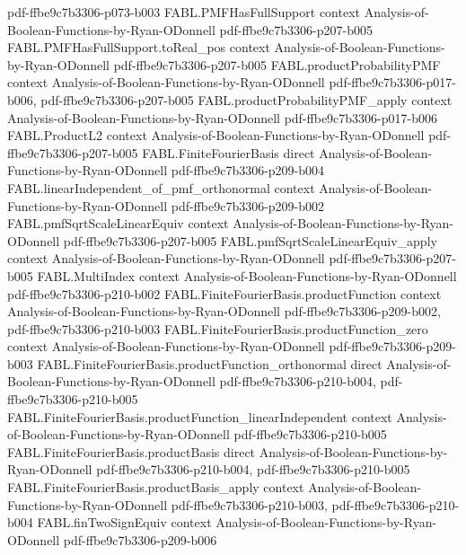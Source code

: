 \begin{theorem}
  {pdf-ffbe9c7b3306-p073-b003}
\proofstep
  {FABL.PMFHasFullSupport}
  {context}
  {Analysis-of-Boolean-Functions-by-Ryan-ODonnell}
  {pdf-ffbe9c7b3306-p207-b005}
\proofstep
  {FABL.PMFHasFullSupport.toReal_pos}
  {context}
  {Analysis-of-Boolean-Functions-by-Ryan-ODonnell}
  {pdf-ffbe9c7b3306-p207-b005}
\proofstep
  {FABL.productProbabilityPMF}
  {context}
  {Analysis-of-Boolean-Functions-by-Ryan-ODonnell}
  {pdf-ffbe9c7b3306-p017-b006,
    pdf-ffbe9c7b3306-p207-b005}
\proofstep
  {FABL.productProbabilityPMF_apply}
  {context}
  {Analysis-of-Boolean-Functions-by-Ryan-ODonnell}
  {pdf-ffbe9c7b3306-p017-b006}
\proofstep
  {FABL.ProductL2}
  {context}
  {Analysis-of-Boolean-Functions-by-Ryan-ODonnell}
  {pdf-ffbe9c7b3306-p207-b005}
\proofstep
  {FABL.FiniteFourierBasis}
  {direct}
  {Analysis-of-Boolean-Functions-by-Ryan-ODonnell}
  {pdf-ffbe9c7b3306-p209-b004}
\proofstep
  {FABL.linearIndependent_of_pmf_orthonormal}
  {context}
  {Analysis-of-Boolean-Functions-by-Ryan-ODonnell}
  {pdf-ffbe9c7b3306-p209-b002}
\proofstep
  {FABL.pmfSqrtScaleLinearEquiv}
  {context}
  {Analysis-of-Boolean-Functions-by-Ryan-ODonnell}
  {pdf-ffbe9c7b3306-p207-b005}
\proofstep
  {FABL.pmfSqrtScaleLinearEquiv_apply}
  {context}
  {Analysis-of-Boolean-Functions-by-Ryan-ODonnell}
  {pdf-ffbe9c7b3306-p207-b005}
\proofstep
  {FABL.MultiIndex}
  {context}
  {Analysis-of-Boolean-Functions-by-Ryan-ODonnell}
  {pdf-ffbe9c7b3306-p210-b002}
\proofstep
  {FABL.FiniteFourierBasis.productFunction}
  {context}
  {Analysis-of-Boolean-Functions-by-Ryan-ODonnell}
  {pdf-ffbe9c7b3306-p209-b002,
    pdf-ffbe9c7b3306-p210-b003}
\proofstep
  {FABL.FiniteFourierBasis.productFunction_zero}
  {context}
  {Analysis-of-Boolean-Functions-by-Ryan-ODonnell}
  {pdf-ffbe9c7b3306-p209-b003}
\proofstep
  {FABL.FiniteFourierBasis.productFunction_orthonormal}
  {direct}
  {Analysis-of-Boolean-Functions-by-Ryan-ODonnell}
  {pdf-ffbe9c7b3306-p210-b004,
    pdf-ffbe9c7b3306-p210-b005}
\proofstep
  {FABL.FiniteFourierBasis.productFunction_linearIndependent}
  {context}
  {Analysis-of-Boolean-Functions-by-Ryan-ODonnell}
  {pdf-ffbe9c7b3306-p210-b005}
\proofstep
  {FABL.FiniteFourierBasis.productBasis}
  {direct}
  {Analysis-of-Boolean-Functions-by-Ryan-ODonnell}
  {pdf-ffbe9c7b3306-p210-b004,
    pdf-ffbe9c7b3306-p210-b005}
\proofstep
  {FABL.FiniteFourierBasis.productBasis_apply}
  {context}
  {Analysis-of-Boolean-Functions-by-Ryan-ODonnell}
  {pdf-ffbe9c7b3306-p210-b003,
    pdf-ffbe9c7b3306-p210-b004}
\proofstep
  {FABL.finTwoSignEquiv}
  {context}
  {Analysis-of-Boolean-Functions-by-Ryan-ODonnell}
  {pdf-ffbe9c7b3306-p209-b006}

\end{theorem}
